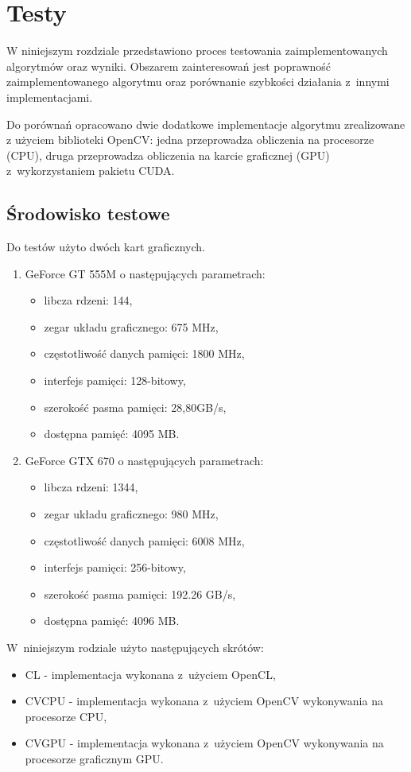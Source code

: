 \chapter{Testy}
\label{cha:testy}

W niniejszym rozdziale przedstawiono proces testowania zaimplementowanych algorytmów oraz wyniki. Obszarem zainteresowań jest poprawność zaimplementowanego algorytmu oraz porównanie szybkości działania z~innymi implementacjami.

Do porównań opracowano dwie dodatkowe implementacje algorytmu zrealizowane z użyciem biblioteki OpenCV: jedna przeprowadza obliczenia na procesorze (CPU), druga przeprowadza obliczenia na karcie graficznej (GPU) z~wykorzystaniem pakietu CUDA.

\section{Środowisko testowe}
\label{sec:srodowiskoTesty}

Do testów użyto dwóch kart graficznych.

\begin{enumerate}
\item GeForce GT 555M \cite{GT555M} o następujących parametrach:
\begin{itemize}
\item libcza rdzeni: 144,
\item zegar układu graficznego: 675 MHz,
\item częstotliwość danych pamięci: 1800 MHz,
\item interfejs pamięci: 128-bitowy,
\item szerokość pasma pamięci: 28,80GB/s,
\item dostępna pamięć: 4095 MB.
\end{itemize}

\item GeForce GTX 670 \cite{GT555M} o następujących parametrach:
\begin{itemize}
\item libcza rdzeni: 1344,
\item zegar układu graficznego: 980 MHz,
\item częstotliwość danych pamięci: 6008 MHz,
\item interfejs pamięci: 256-bitowy,
\item szerokość pasma pamięci: 192.26 GB/s,
\item dostępna pamięć: 4096 MB.
\end{itemize}
\end{enumerate}

W~niniejszym rodziale użyto następujących skrótów:
\begin{itemize}
\item CL - implementacja wykonana z~użyciem OpenCL,
\item CVCPU - implementacja wykonana z~użyciem OpenCV wykonywania na procesorze CPU,
\item CVGPU - implementacja wykonana z~użyciem OpenCV wykonywania na procesorze graficznym GPU.
\end{itemize}

